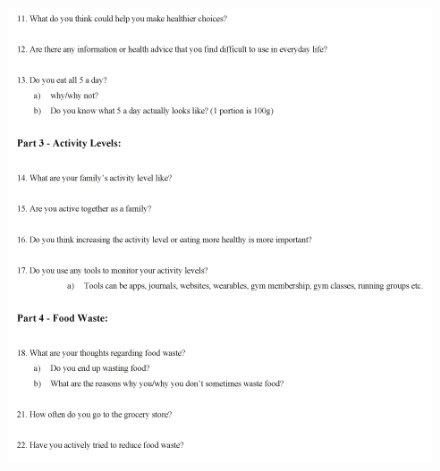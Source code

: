     \begin{figure}
        \centering
        \includegraphics[scale=0.8]{figures/intervguide3.pdf}
    \end{figure}

